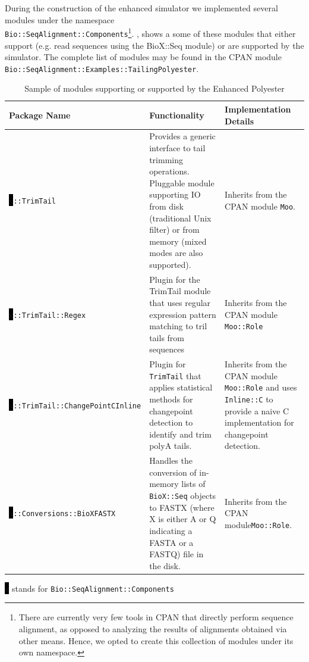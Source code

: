 \documentclass[10pt]{article}
\begin{document}
During the construction of the enhanced simulator we implemented several modules under the namespace\\ \texttt{Bio::SeqAlignment::Components}\footnote{There are currently very few tools in CPAN that directly perform sequence alignment, as opposed to analyzing the results of alignments obtained via other means. Hence, we opted to create this collection of modules under its own namespace.}.  , shows a some of these modules that either support (e.g. read sequences using the BioX::Seq module) or are supported by the simulator. The complete list of modules may be found in the CPAN module \texttt{Bio::SeqAlignment::Examples::TailingPolyester}.


\begin{table}[!h]\footnotesize\centering
\caption[Table caption text]{Sample of modules supporting or supported by the Enhanced Polyester}
	\begin{tabularx}{1.0\textwidth}{X|p{6.55cm}|p{3.8cm}}
\toprule
	Package Name & Functionality & Implementation Details\\
\midrule
	\colorbox{black}{x}\texttt{::TrimTail} & Provides a generic interface to tail trimming operations. Pluggable module supporting IO from disk (traditional Unix filter) or from memory (mixed modes are also supported). & Inherits from the CPAN module \texttt{Moo}. \\
	\colorbox{black}{x}\texttt{::TrimTail::Regex} & Plugin for the TrimTail module that uses regular expression pattern matching to tril tails from sequences & Inherits from the CPAN module \texttt{Moo::Role}\\
\colorbox{black}{x}\texttt{::TrimTail::ChangePointCInline} & Plugin for \texttt{TrimTail} that applies statistical methods for changepoint detection to identify and trim polyA tails. & Inherits from the CPAN module \texttt{Moo::Role} and uses \texttt{Inline::C} to provide a naive C implementation for changepoint detection.\\
\colorbox{black}{x}\texttt{::Conversions::BioXFASTX} & Handles 
the conversion of in-memory lists of \texttt{BioX::Seq} objects to FASTX (where X is either A or Q
indicating a FASTA or a FASTQ) file in the disk. & Inherits from the CPAN module\texttt{Moo::Role}.\\
\bottomrule
\end{tabularx}
\vspace{12pt}
\raggedright\footnotesize{\colorbox{black}{x} stands for \texttt{Bio::SeqAlignment::Components}}
\label{tab:ModulesForPipeline}
\end{table}
\end{document}
